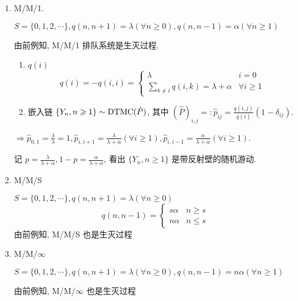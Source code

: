 \begin{enumerate}
    \item M/M/1. 
    
    $S=\{0,1,2,\cdots\}, q(n,n+1)=\lambda (\forall n\geq 0), q(n,n-1)=\alpha (\forall n\geq 1)$

    由前例知, M/M/1 排队系统是生灭过程.
    \begin{enumerate}
        \item $q(i)$
        \[
        q(i)=-q(i,i)=\begin{cases}
            \lambda & i=0\\
            \sum_{k\neq i}q(i,k)=\lambda +\alpha & \forall i\geq 1
        \end{cases}
        \]
        \item 嵌入链 $\{Y_n,n\geqslant 1\}\sim \operatorname{DTMC}(\hat{P})$, 其中 $\displaystyle (\hat{P})_{i,j}=:\hat{p}_{ij}=\frac{q(i,j)}{q(i)}(1-\delta_{ij})$. 
    \end{enumerate}
    $\displaystyle \Rightarrow \hat{p}_{0,1}=\frac{\lambda}{\lambda}=1,\hat{p}_{i,i+1}=\frac{\lambda}{\lambda+\alpha}(\forall i\geq 1), \hat{p}_{i,i-1}=\frac{\alpha}{\lambda+\alpha}(\forall i\geq 1)$.

    记 $p=\frac{\lambda}{\lambda+\alpha},1-p=\frac{\alpha}{\lambda+\alpha}$, 看出 $\{Y_n,n\geq 1\}$ 是带反射壁的随机游动.
    \item M/M/S
    
    $S=\{0,1,2,\cdots\}, q(n,n+1)=\lambda (\forall n\geq 0)$
    \[
    q(n,n-1)=\begin{cases}
        s\alpha & n\geq s\\
        n\alpha & n\leq s
    \end{cases}
    \]
    由前例知, M/M/S 也是生灭过程
    \item M/M/$\infty$
    
    $S=\{0,1,2,\cdots\}, q(n,n+1)=\lambda (\forall n\geq 0), q(n,n-1)=n\alpha (\forall n\geq 1)$

    由前例知, M/M/$\infty$ 也是生灭过程
\end{enumerate}
\newpage